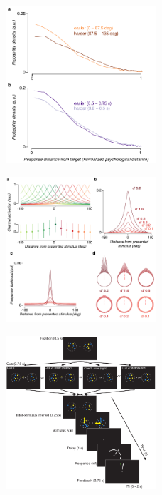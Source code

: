 \begin{figure}
\centering
\includegraphics[keepaspectratio,width=0.5\textwidth]{figs_c4/f2_aca_parameters.pdf}
\caption[Behavioral task]{}
\label{fig:c4f3}
\end{figure}

\begin{figure}
\centering
\includegraphics[keepaspectratio,width=0.5\textwidth]{figs_c4/f3_TCC_model.pdf}
\caption[TCC model]{}
\label{fig:c4f4}
\end{figure}

\begin{figure}
\centering
\includegraphics[keepaspectratio,width=0.5\textwidth]{figs_c4/f4_estimationtask.pdf}
\caption[Estimation task]{}
\label{fig:c4f5}
\end{figure}

